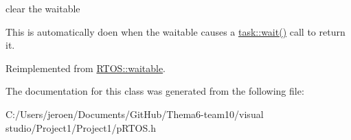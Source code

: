 clear the waitable 

This is automatically doen when the waitable causes a \hyperlink{class_r_t_o_s_1_1task_a6fc603d0f1c8a94813586d3dfd123fcc}{task\+::wait()} call to return it. 

Reimplemented from \hyperlink{class_r_t_o_s_1_1waitable_a44ac71980592721bc03e076acc7e8c67}{R\+T\+O\+S\+::waitable}.



The documentation for this class was generated from the following file\+:\begin{DoxyCompactItemize}
\item 
C\+:/\+Users/jeroen/\+Documents/\+Git\+Hub/\+Thema6-\/team10/visual studio/\+Project1/\+Project1/p\+R\+T\+O\+S.\+h\end{DoxyCompactItemize}
